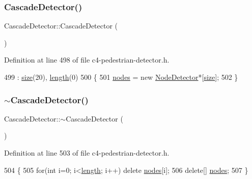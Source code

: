 \subsubsection{\texorpdfstring{Cascade\+Detector()}{CascadeDetector()}}
{\footnotesize\ttfamily Cascade\+Detector\+::\+Cascade\+Detector (\begin{DoxyParamCaption}{ }\end{DoxyParamCaption})\hspace{0.3cm}{\ttfamily [inline]}}



Definition at line 498 of file c4-\/pedestrian-\/detector.\+h.


\begin{DoxyCode}
499         : \mbox{\hyperlink{class_cascade_detector_a4a1280062076bdea7b404e9fca3a53a4}{size}}(20), \mbox{\hyperlink{class_cascade_detector_a2ce4d234703b3332cf7e17624b3b30a5}{length}}(0)
500     \{
501         \mbox{\hyperlink{class_cascade_detector_a7977422f255cf4d753665c0c6a0b0f07}{nodes}} = \textcolor{keyword}{new} \mbox{\hyperlink{class_node_detector}{NodeDetector}}*[\mbox{\hyperlink{class_cascade_detector_a4a1280062076bdea7b404e9fca3a53a4}{size}}];
502     \}
\end{DoxyCode}
\mbox{\label{class_cascade_detector_acd01c8d06da3ea93446d71f3d35f4e1e}} 
\subsubsection{\texorpdfstring{$\sim$\+Cascade\+Detector()}{~CascadeDetector()}}
{\footnotesize\ttfamily Cascade\+Detector\+::$\sim$\+Cascade\+Detector (\begin{DoxyParamCaption}{ }\end{DoxyParamCaption})\hspace{0.3cm}{\ttfamily [inline]}}



Definition at line 503 of file c4-\/pedestrian-\/detector.\+h.


\begin{DoxyCode}
504     \{
505         \textcolor{keywordflow}{for}(\textcolor{keywordtype}{int} i=0; i<\mbox{\hyperlink{class_cascade_detector_a2ce4d234703b3332cf7e17624b3b30a5}{length}}; i++) \textcolor{keyword}{delete} \mbox{\hyperlink{class_cascade_detector_a7977422f255cf4d753665c0c6a0b0f07}{nodes}}[i];
506         \textcolor{keyword}{delete}[] \mbox{\hyperlink{class_cascade_detector_a7977422f255cf4d753665c0c6a0b0f07}{nodes}};
507     \}
\end{DoxyCode}


